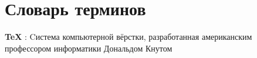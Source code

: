 \chapter*{Словарь терминов}             %

\textbf{TeX} : Cистема компьютерной вёрстки, разработанная американским профессором информатики Дональдом Кнутом

